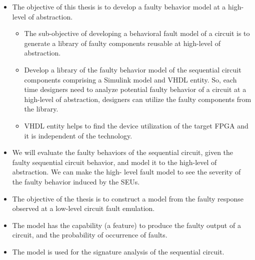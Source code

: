 \begin{itemize}

\item{The objective of this thesis is to develop a faulty behavior model
at a high-level of abstraction.} 
\begin{itemize}
\item The sub-objective of developing a behavioral fault model of a circuit is to generate a library of faulty components reusable at high-level of abstraction.
\item{Develop a library of the faulty behavior model of the sequential circuit
components comprising a Simulink model and VHDL entity. So, each time designers need to analyze potential faulty behavior of a circuit at a high-level of abstraction, designers can utilize the faulty components from the library}.
\item VHDL entity helps to find the device utilization of the target FPGA and it is independent of the technology.
\end{itemize}

\item We will evaluate the faulty behaviors of the sequential circuit, given the faulty sequential circuit behavior, and model it to the high-level of abstraction. We can make the high- level fault model to see the severity of the faulty behavior induced by the SEUs.
\item The objective of the thesis is to construct a model from the faulty response observed at a low-level circuit fault emulation.



\item{The model has the capability (a feature) to produce the faulty output of a circuit, and the probability of occurrence of faults.}

\item The model is used for the signature analysis of the sequential circuit.




\end{itemize}

